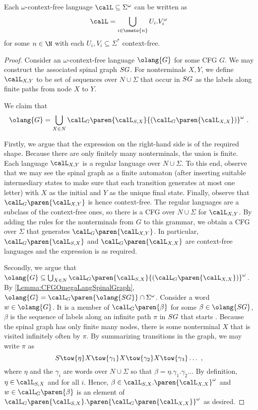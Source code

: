 \documentclass[../../diss.tex]{subfiles}
\begin{document}
\begin{proposition}
    Each $\omega$-context-free language $\calL \subseteq \Sigma^\omega$ can be written as
    \[
        \calL = \bigcup_{i \in \oneto{n}} U_i . V_i^\omega
    \]
    for some $n \in \N$ with each $U_i, V_i \subseteq \Sigma^*$ context-free.
\end{proposition}

\begin{proof}
    Consider an $\omega$-context-free language $\olang{G}$ for some CFG $G$.
    We may construct the associated spinal graph $SG$.
    For nonterminals $X,Y$, we define $\calL_{X,Y}$ to be set of sequences over $N \cup \Sigma$ that occur in $SG$ as the labels along finite paths from node $X$ to $Y$.

    We claim that
    \[
        \olang{G} = \bigcup_{X \in N} \calL_G\paren{\calL_{S,X}} {(\calL_G\paren{\calL_{X,X}})}^\omega
        \ .
    \]

    Firstly, we argue that the expression on the right-hand side is of the required shape.
    Because there are only finitely many nonterminals, the union is finite.
    Each language $\calL_{X,Y}$ is a regular language over $N \cup \Sigma$.
    To this end, observe that we may see the spinal graph as a finite automaton (after inserting suitable intermediary states to make sure that each transition generates at most one letter) with $X$ as the initial and $Y$ as the unique final state.
    Finally, observe that $\calL_G\paren{\calL_{X,Y}}$ is hence context-free.
    The regular languages are a subclass of the context-free ones, so there is a CFG over $N \cup \Sigma$ for $\calL_{X,Y}$.
    By adding the rules for the nonterminals from $G$ to this grammar, we obtain a CFG over $\Sigma$ that generates
    $\calL_G\paren{\calL_{X,Y}}$.
    In particular, $\calL_G\paren{\calL_{S,X}}$ and $\calL_G\paren{\calL_{X,X}}$ are context-free languages and the expression is as required.

    Secondly, we argue that $\olang{G} \subseteq \bigcup_{X \in N} \calL_G\paren{\calL_{S,X}} {(\calL_G\paren{\calL_{X,X}})}^\omega$.
    By \cref{Lemma:CFGOmegaLangSpinalGraph}, $\olang{G} = \calL_G\paren{\olang{\SpinalGraph}} \cap \Sigma^\omega$.
    Consider a word $w \in \olang{G}$.
    It is a member of $\calL_G\paren{\beta}$ for some $\beta \in \olang{\SpinalGraph}$, \ie $\beta$ is the sequence of labels along an infinite path $\pi$ in $SG$ that starts .
    Because the spinal graph has only finite many nodes, there is some nonterminal $X$ that is visited infinitely often by $\pi$.
    By summarizing transitions in the graph, we may write $\pi$ as
    \[
        S \tow{\eta} X \tow{\gamma_1} X \tow{\gamma_2} X \tow{\gamma_3} \ldots \ ,
    \]
    where $\eta$ and the $\gamma_i$ are words over $N \cup \Sigma$ so that $\beta = \eta.\gamma_1.\gamma_2\ldots$
    By definition, $\eta \in \calL_{S,X}$ and  for all $i$.
    Hence, $\beta \in  \calL_{S,X}.\paren{\calL_{X,X}}^\omega$ and $w \in \calL_G\paren{\beta}$ is an element of~$\calL_G\paren{\calL_{S,X}}.\paren{\calL_G\paren{\calL_{X,X}}}^\omega$ as desired.


\end{proof}
\end{document}
